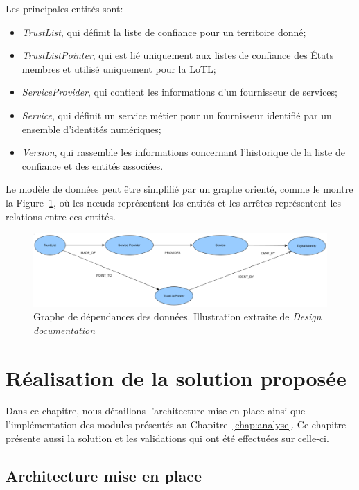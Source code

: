 \documentclass{tnreport}
\begin{document}
Les principales entités sont:
\begin{itemize}
	\item \textit{TrustList}, qui définit la liste de confiance pour un territoire donné;
	\item \textit{TrustListPointer}, qui est lié uniquement aux listes de confiance des États membres et utilisé uniquement pour la LoTL;
	\item \textit{ServiceProvider}, qui contient les informations d'un fournisseur de services;
	\item \textit{Service}, qui définit un service métier pour un fournisseur identifié par un ensemble d'identités numériques;
	\item \textit{Version}, qui rassemble les informations concernant l'historique de la liste de confiance et des entités associées.
\end{itemize}
\clearpage

Le modèle de données peut être simplifié par un graphe orienté, comme le montre la Figure~\ref{fig:dependencies}, où les nœuds représentent les entités et les arrêtes représentent les relations entre ces entités.

\begin{figure}[h]
	\centering
	\includegraphics[scale=0.42]{figures/dependencies}
	\caption{Graphe de dépendances des données. Illustration extraite de \textit{Design documentation}~\cite{design-document}}
	\label{fig:dependencies}
\end{figure}

\chapter{Réalisation de la solution proposée}
\label{chap:realisation}

Dans ce chapitre, nous détaillons l'architecture mise en place ainsi que l'implémentation des modules présentés au Chapitre~\ref{chap:analyse}. Ce chapitre présente aussi la solution et les validations qui ont été effectuées sur celle-ci.

\section{Architecture mise en place}
\label{sec:architecture}
\end{document}

